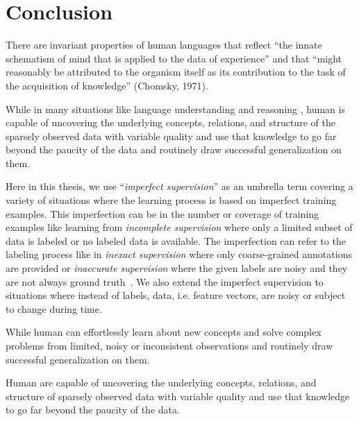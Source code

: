 \chapter{Conclusion}


There are invariant properties of human languages that reflect ``the innate schematism of mind that is applied to the data of experience'' and that ``might reasonably be attributed to the organism itself as its contribution to the task of the acquisition of knowledge'' (Chomsky, 1971).

While in many situations like language understanding and reasoning , human is capable of uncovering the underlying concepts, relations, and structure of the sparsely observed data with variable quality and use that knowledge to go far beyond the paucity of the data and routinely draw successful generalization on them.


Here in this thesis, we use ``\emph{imperfect supervision}'' as an umbrella term covering a variety of situations where the learning process is based on imperfect training examples. This imperfection can be in the number or coverage of training examples like learning from \emph{incomplete supervision} where only a limited subset of data is labeled or no labeled data is available. The imperfection can refer to the labeling process like in \emph{inexact supervision} where only coarse-grained annotations are provided or \emph{inaccurate supervision} where the given labels are noisy and they are not always ground truth~\citep{zhou2018brief}. We also extend the imperfect supervision to situations where instead of labels, data, i.e. feature vectors, are noisy or subject to change during time.

While human can effortlessly learn about new concepts and solve complex problems from limited, noisy or inconsistent observations and routinely draw successful generalization on them.

Human are capable of uncovering the underlying concepts, relations, and structure of sparsely observed data with variable quality and use that knowledge to go far beyond the paucity of the data.

